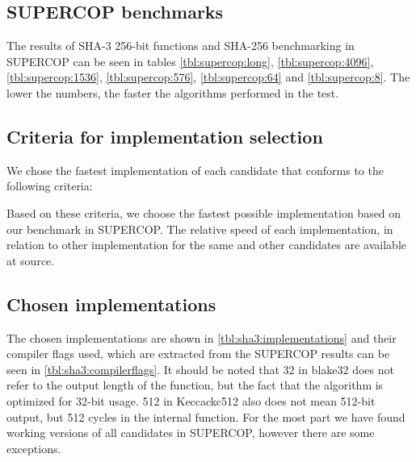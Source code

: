 \documentclass[english,12pt,a4paper]{book}
\begin{document}
\subsection{\ac{SUPERCOP} benchmarks}
The results of \ac{SHA}-3
256-bit functions and \ac{SHA}-256 benchmarking in \ac{SUPERCOP} can be seen in
tables \ref{tbl:supercop:long}, \ref{tbl:supercop:4096},
\ref{tbl:supercop:1536}, \ref{tbl:supercop:576}, \ref{tbl:supercop:64} and
\ref{tbl:supercop:8}. The lower the numbers, the faster the algorithms
performed in the test.








\subsection{Criteria for implementation selection}

We chose the fastest implementation of each candidate that conforms to the
following criteria:

Based on these criteria, we choose the fastest possible implementation based
on our benchmark in \ac{SUPERCOP}. The relative speed of each implementation, in
relation to other implementation for the same and other candidates are
available at source.

\subsection{Chosen implementations}

The chosen implementations are shown in \ref{tbl:sha3:implementations} and
their compiler flags used, which are extracted from the \ac{SUPERCOP} results
can be seen in \ref{tbl:sha3:compilerflags}. It should be noted that 32 in
blake32 does not refer to the output length of the function, but the fact that
the algorithm is optimized for 32-bit usage. 512 in Keccackc512 also does not
mean 512-bit output, but 512 cycles in the internal function. For the most part
we have found working versions of all candidates in \ac{SUPERCOP}, however
there are some exceptions.
\end{document}
